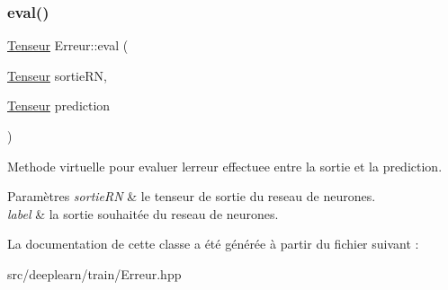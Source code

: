\subsubsection{\texorpdfstring{eval()}{eval()}}
{\footnotesize\ttfamily \hyperlink{class_tenseur}{Tenseur} Erreur\+::eval (\begin{DoxyParamCaption}\item[{\hyperlink{class_tenseur}{Tenseur}}]{sortie\+RN,  }\item[{\hyperlink{class_tenseur}{Tenseur}}]{prediction }\end{DoxyParamCaption})\hspace{0.3cm}{\ttfamily [virtual]}}



Methode virtuelle pour evaluer l\textquotesingle{}erreur effectuee entre la sortie et la prediction. 


\begin{DoxyParams}{Paramètres}
{\em sortie\+RN} & le tenseur de sortie du reseau de neurones. \\
\hline
{\em label} & la sortie souhaitée du reseau de neurones. \\
\hline
\end{DoxyParams}


La documentation de cette classe a été générée à partir du fichier suivant \+:\begin{DoxyCompactItemize}
\item 
src/deeplearn/train/Erreur.\+hpp\end{DoxyCompactItemize}
